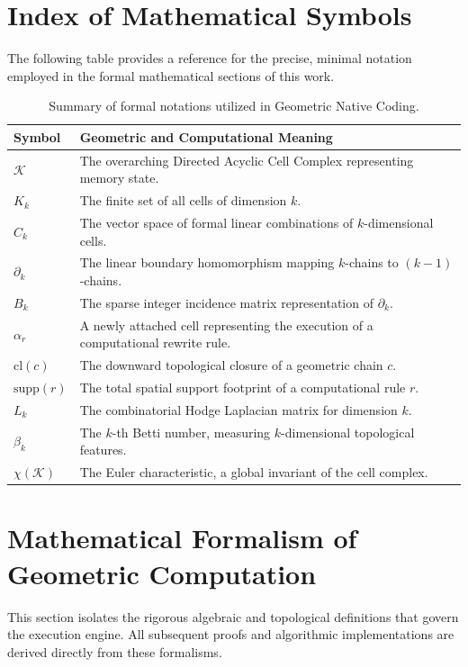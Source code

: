 \documentclass[11pt, a4paper]{article}
\begin{document}
\section{Index of Mathematical Symbols}
The following table provides a reference for the precise, minimal notation employed in the formal mathematical sections of this work.

\begin{table}[h]
    \centering
    \renewcommand{\arraystretch}{1.3}
    \begin{tabular}{@{}ll@{}}
        \toprule
        \textbf{Symbol} & \textbf{Geometric and Computational Meaning} \\
        \midrule
        $\mathcal{K}$ & The overarching Directed Acyclic Cell Complex representing memory state. \\
        $K_k$ & The finite set of all cells of dimension $k$. \\
        $C_k$ & The vector space of formal linear combinations of $k$-dimensional cells. \\
        $\partial_k$ & The linear boundary homomorphism mapping $k$-chains to $(k-1)$-chains. \\
        $B_k$ & The sparse integer incidence matrix representation of $\partial_k$. \\
        $\alpha_r$ & A newly attached cell representing the execution of a computational rewrite rule. \\
        $\text{cl}(c)$ & The downward topological closure of a geometric chain $c$. \\
        $\text{supp}(r)$ & The total spatial support footprint of a computational rule $r$. \\
        $L_k$ & The combinatorial Hodge Laplacian matrix for dimension $k$. \\
        $\beta_k$ & The $k$-th Betti number, measuring $k$-dimensional topological features. \\
        $\chi(\mathcal{K})$ & The Euler characteristic, a global invariant of the cell complex. \\
        \bottomrule
    \end{tabular}
    \caption{Summary of formal notations utilized in Geometric Native Coding.}
    \label{tab:symbols}
\end{table}

\section{Mathematical Formalism of Geometric Computation}
This section isolates the rigorous algebraic and topological definitions that govern the execution engine. All subsequent proofs and algorithmic implementations are derived directly from these formalisms.
\end{document}

